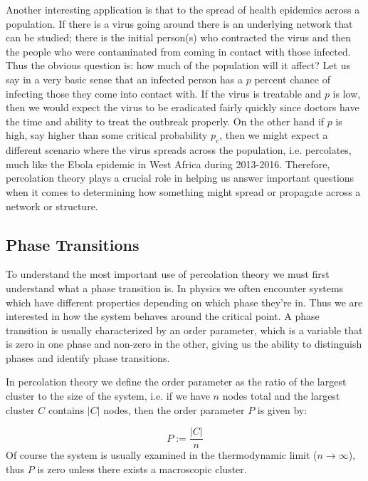 Another interesting application is that to the spread of health epidemics across a population.
If there is a virus going around there is an underlying network that can be studied; there is the initial person(s) who contracted the virus and then the people who were contaminated from coming in contact with those infected.
Thus the obvious question is: how much of the population will it affect?
Let us say in a very basic sense that an infected person has a $p$ percent chance of infecting those they come into contact with.
If the virus is treatable and $p$ is low, then we would expect the virus to be eradicated fairly quickly since doctors have the time and ability to treat the outbreak properly.
On the other hand if $p$ is high, say higher than some critical probability $p_c$, then we might expect a different scenario where the virus spreads across the population, i.e. percolates, much like the Ebola epidemic in West Africa during 2013-2016.
Therefore, percolation theory plays a crucial role in helping us answer important questions when it comes to determining how something might spread or propagate across a network or structure.









\subsection{Phase Transitions}
To understand the most important use of percolation theory we must first understand what a phase transition is.
In physics we often encounter systems which have different properties depending on which phase they're in.
Thus we are interested in how the system behaves around the critical point.
A phase transition is usually characterized by an order parameter, which is a variable that is zero in one phase and non-zero in the other, giving us the ability to distinguish phases and identify phase transitions.

In percolation theory we define the order parameter as the ratio of the largest cluster to the size of the system, i.e. if we have $n$ nodes total and the largest cluster $C$ contains $|C|$ nodes, then the order parameter $P$ is given by:

\begin{equation}
	\label{eqn:order_parameter}
	P := \frac{|C|}{n}
\end{equation}
Of course the system is usually examined in the thermodynamic limit ($n \rightarrow \infty$), thus $P$ is zero unless there exists a macroscopic cluster.

